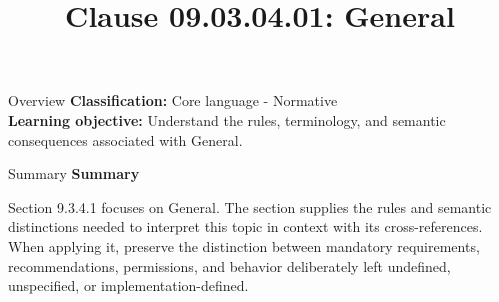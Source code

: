 \documentclass[10pt,letterpaper]{article}
\title{Clause 09.03.04.01: General}
\author{}
\date{}
\begin{document}
\maketitle
\begin{CornellOverviewBox}{Overview}
\textbf{Classification:} Core language - Normative\\[2pt]
\textbf{Learning objective:} Understand the rules, terminology, and semantic consequences associated with General.
\end{CornellOverviewBox}\begin{CornellSummaryBox}{Summary}
{\sffamily\bfseries\color{Accent} Summary}\par\vspace{3pt}Section 9.3.4.1 focuses on General. The section supplies the rules and semantic distinctions needed to interpret this topic in context with its cross-references. When applying it, preserve the distinction between mandatory requirements, recommendations, permissions, and behavior deliberately left undefined, unspecified, or implementation-defined.
\end{CornellSummaryBox}
\end{document}
